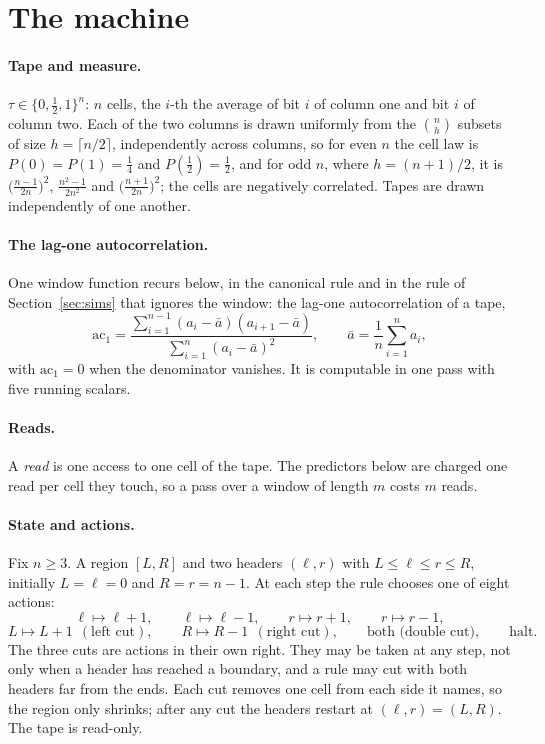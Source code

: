 \documentclass[11pt]{article}
\begin{document}
\section{The machine}\label{sec:machine}

\paragraph{Tape and measure.} $\tau\in\{0,\tfrac12,1\}^n$: $n$ cells, the $i$-th the average of bit $i$ of column one and bit $i$ of column two.
Each of the two columns is drawn uniformly from the $\binom nh$ subsets of size $h=\lceil n/2\rceil$,
independently across columns, so for even $n$ the cell law is $P(0)=P(1)=\tfrac14$ and
$P(\tfrac12)=\tfrac12$, and for odd $n$, where $h=(n+1)/2$, it is
$\big(\frac{n-1}{2n}\big)^2$, $\frac{n^2-1}{2n^2}$ and $\big(\frac{n+1}{2n}\big)^2$; the cells are
negatively correlated. Tapes are drawn independently of one another.

\paragraph{The lag-one autocorrelation.} One window function recurs below, in the canonical rule
and in the rule of Section~\ref{sec:sims} that ignores the window: the lag-one autocorrelation of
a tape,
\[
\mathrm{ac}_1=\frac{\sum_{i=1}^{n-1}(a_i-\bar a)(a_{i+1}-\bar a)}{\sum_{i=1}^{n}(a_i-\bar a)^2},
\qquad \bar a=\frac1n\sum_{i=1}^{n}a_i,
\]
with $\mathrm{ac}_1=0$ when the denominator vanishes. It is computable in one pass with five running
scalars.

\paragraph{Reads.} A \emph{read} is one access to one cell of the tape. The predictors below are
charged one read per cell they touch, so a pass over a window of length $m$ costs $m$ reads.

\paragraph{State and actions.} Fix $n\ge3$. A region $[L,R]$ and two headers $(\ell,r)$ with
$L\le\ell\le r\le R$, initially $L=\ell=0$ and $R=r=n-1$. At each step the rule chooses one of eight
actions:
\[
\ell\mapsto\ell+1,\qquad \ell\mapsto\ell-1,\qquad r\mapsto r+1,\qquad r\mapsto r-1,
\]
\[
L\mapsto L+1\ \ (\text{left cut}),\qquad R\mapsto R-1\ \ (\text{right cut}),\qquad
\text{both (double cut)},\qquad \text{halt}.
\]
The three cuts are actions in their own right. They may be taken at any step, not only
when a header has reached a boundary, and a rule may cut with both headers far from the ends.
Each cut removes one cell from each side it names, so the region only shrinks; after any cut the
headers restart at $(\ell,r)=(L,R)$. The tape is read-only.
\end{document}
